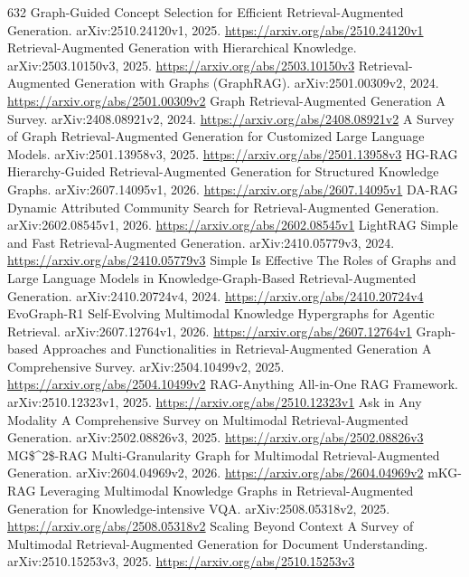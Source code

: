 \documentclass[11pt]{article}
\begin{document}
\begin{thebibliography}{632}
 Graph-Guided Concept Selection for Efficient Retrieval-Augmented Generation. arXiv:2510.24120v1, 2025. \url{https://arxiv.org/abs/2510.24120v1}
 Retrieval-Augmented Generation with Hierarchical Knowledge. arXiv:2503.10150v3, 2025. \url{https://arxiv.org/abs/2503.10150v3}
 Retrieval-Augmented Generation with Graphs (GraphRAG). arXiv:2501.00309v2, 2024. \url{https://arxiv.org/abs/2501.00309v2}
 Graph Retrieval-Augmented Generation A Survey. arXiv:2408.08921v2, 2024. \url{https://arxiv.org/abs/2408.08921v2}
 A Survey of Graph Retrieval-Augmented Generation for Customized Large Language Models. arXiv:2501.13958v3, 2025. \url{https://arxiv.org/abs/2501.13958v3}
 HG-RAG Hierarchy-Guided Retrieval-Augmented Generation for Structured Knowledge Graphs. arXiv:2607.14095v1, 2026. \url{https://arxiv.org/abs/2607.14095v1}
 DA-RAG Dynamic Attributed Community Search for Retrieval-Augmented Generation. arXiv:2602.08545v1, 2026. \url{https://arxiv.org/abs/2602.08545v1}
 LightRAG Simple and Fast Retrieval-Augmented Generation. arXiv:2410.05779v3, 2024. \url{https://arxiv.org/abs/2410.05779v3}
 Simple Is Effective The Roles of Graphs and Large Language Models in Knowledge-Graph-Based Retrieval-Augmented Generation. arXiv:2410.20724v4, 2024. \url{https://arxiv.org/abs/2410.20724v4}
 EvoGraph-R1 Self-Evolving Multimodal Knowledge Hypergraphs for Agentic Retrieval. arXiv:2607.12764v1, 2026. \url{https://arxiv.org/abs/2607.12764v1}
 Graph-based Approaches and Functionalities in Retrieval-Augmented Generation A Comprehensive Survey. arXiv:2504.10499v2, 2025. \url{https://arxiv.org/abs/2504.10499v2}
 RAG-Anything All-in-One RAG Framework. arXiv:2510.12323v1, 2025. \url{https://arxiv.org/abs/2510.12323v1}
 Ask in Any Modality A Comprehensive Survey on Multimodal Retrieval-Augmented Generation. arXiv:2502.08826v3, 2025. \url{https://arxiv.org/abs/2502.08826v3}
 MG\$\textasciicircum{}2\$-RAG Multi-Granularity Graph for Multimodal Retrieval-Augmented Generation. arXiv:2604.04969v2, 2026. \url{https://arxiv.org/abs/2604.04969v2}
 mKG-RAG Leveraging Multimodal Knowledge Graphs in Retrieval-Augmented Generation for Knowledge-intensive VQA. arXiv:2508.05318v2, 2025. \url{https://arxiv.org/abs/2508.05318v2}
 Scaling Beyond Context A Survey of Multimodal Retrieval-Augmented Generation for Document Understanding. arXiv:2510.15253v3, 2025. \url{https://arxiv.org/abs/2510.15253v3}

\end{thebibliography}
\end{document}
